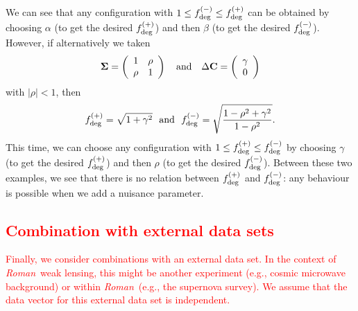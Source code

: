 \documentclass[usenatbib]{mnras}
\newcommand{\wfirst}{{\slshape Roman}}
\newcommand{\changetext}[1]{\textcolor{red}{#1}}
\begin{document}
{We can see that any configuration with $1 \le f_{\rm deg}^{(-)} \le f_{\rm deg}^{(+)}$ can be obtained by choosing $\alpha$ (to get the desired $f_{\rm deg}^{(+)}$) and then $\beta$ (to get the desired $f_{\rm deg}^{(-)}$). However, if alternatively we taken
\begin{equation}
{\boldsymbol\Sigma} = \left( \begin{array}{cc} 1 & \rho \\ \rho & 1 \end{array} \right)
~~~{\rm and}~~~
\Delta{\bf C} = \left( \begin{array}c \gamma \\ 0 \end{array} \right)
\end{equation}
with $|\rho|<1$, then
\begin{equation}
f_{\rm deg}^{(+)} = \sqrt{1+\gamma^2} ~~{\rm and}~~ f_{\rm deg}^{(-)} = \sqrt{\frac{1-\rho^2+\gamma^2}{1-\rho^2}}.
\end{equation}
This time, we can choose any configuration with $1\le f_{\rm deg}^{(+)}\le f_{\rm deg}^{(-)}$ by choosing $\gamma$ (to get the desired $f_{\rm deg}^{(+)}$) and then $\rho$ (to get the desired $f_{\rm deg}^{(-)}$). Between these two examples, we see that there is no relation between $f_{\rm deg}^{(+)}$ and $f_{\rm deg}^{(-)}$: any behaviour is possible when we add a nuisance parameter.}

\subsection{\changetext{Combination with external data sets}}

\changetext{Finally, we consider combinations with an external data set. In the context of \wfirst\ weak lensing, this might be another experiment (e.g., cosmic microwave background) or within \wfirst\ (e.g., the supernova survey). We assume that the data vector for this external data set is independent.}
\end{document}
